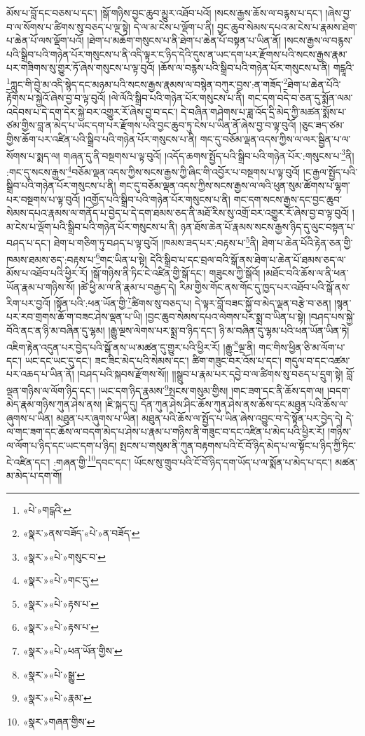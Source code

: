 མོས་པ་བློ་དང་བཅས་པ་དང་། །སྒོ་གཉིས་བྱང་ཆུབ་མྱུར་འཐོབ་པའོ། །སངས་རྒྱས་ཆོས་ལ་བརྙས་པ་དང་། །ཞེས་བྱ་བ་ལ་སོགས་པ་ཚིགས་སུ་བཅད་པ་ལྔ་སྟེ། དེ་ལ་མ་ངེས་པ་ལྡོག་པ་ནི། བྱང་ཆུབ་སེམས་དཔའ་མ་ངེས་པ་རྣམས་ཐེག་པ་ཆེན་པོ་ལས་ལྡོག་པའོ། །ཐེག་པ་མཆོག་གསུངས་པ་ནི་ཐེག་པ་ཆེན་པོ་བསྟན་པ་ཡིན་ནོ། །སངས་རྒྱས་ལ་བརྙས་པའི་སྒྲིབ་པའི་གཉེན་པོར་གསུངས་པ་ནི་འདི་ལྟར་ང་ཉིད་དེའི་དུས་ན་ཡང་དག་པར་རྫོགས་པའི་སངས་རྒྱས་རྣམ་པར་གཟིགས་སུ་གྱུར་ཏོ་ཞེས་གསུངས་པ་ལྟ་བུའོ། །ཆོས་ལ་བརྙས་པའི་སྒྲིབ་པའི་གཉེན་པོར་གསུངས་པ་ནི། གངྒཱའི་\footnote{«པེ་»གངྒའི་}ཀླུང་གི་བྱེ་མ་འདི་སྙེད་དང་མཉམ་པའི་སངས་རྒྱས་རྣམས་ལ་བསྙེན་བཀུར་བྱས་:ན་གཟོད་\footnote{«སྣར་»ནས་བཟོད་«པེ་»ན་བཟོད་}ཐེག་པ་ཆེན་པོའི་རྟོགས་པ་སྐྱེའོ་ཞེས་བྱ་བ་ལྟ་བུའོ། །ལེ་ལོའི་སྒྲིབ་པའི་གཉེན་པོར་གསུངས་པ་ནི། གང་དག་བདེ་བ་ཅན་དུ་སྨོན་ལམ་འདེབས་པ་དེ་དག་དེར་སྐྱེ་བར་འགྱུར་རོ་ཞེས་བྱ་བ་དང་། དེ་བཞིན་གཤེགས་པ་ཟླ་འོད་དྲི་མེད་ཀྱི་མཚན་སྨོས་པ་ཙམ་གྱིས་བླ་ན་མེད་པ་ཡང་དག་པར་རྫོགས་པའི་བྱང་ཆུབ་ཏུ་ངེས་པ་ཡིན་ནོ་ཞེས་བྱ་བ་ལྟ་བུའོ། །ཅུང་ཟད་ཙམ་གྱིས་ཆོག་པར་འཛིན་པའི་སྒྲིབ་པའི་གཉེན་པོར་གསུངས་པ་ནི། གང་དུ་བཅོམ་ལྡན་འདས་ཀྱིས་ལ་ལར་སྦྱིན་པ་ལ་སོགས་པ་སྨད་ལ། གཞན་དུ་ནི་བསྔགས་པ་ལྟ་བུའོ། །འདོད་ཆགས་སྤྱོད་པའི་སྒྲིབ་པའི་གཉེན་པོར་:གསུངས་པ་\footnote{«སྣར་»«པེ་»གསུང་བ་}ནི། :གང་དུ་སངས་རྒྱས་\footnote{«སྣར་»«པེ་»གང་དུ་}བཅོམ་ལྡན་འདས་ཀྱིས་སངས་རྒྱས་ཀྱི་ཞིང་གི་འབྱོར་པ་བསྔགས་པ་ལྟ་བུའོ། །ང་རྒྱལ་སྤྱོད་པའི་སྒྲིབ་པའི་གཉེན་པོར་གསུངས་པ་ནི། གང་དུ་བཅོམ་ལྡན་འདས་ཀྱིས་སངས་རྒྱས་ལ་ལའི་ཕུན་སུམ་ཚོགས་པ་ལྷག་པར་བསྔགས་པ་ལྟ་བུའོ། །འགྱོད་པའི་སྒྲིབ་པའི་གཉེན་པོར་གསུངས་པ་ནི། གང་དག་སངས་རྒྱས་དང་བྱང་ཆུབ་སེམས་དཔའ་རྣམས་ལ་གནོད་པ་བྱེད་པ་དེ་དག་ཐམས་ཅད་ནི་མཐོ་རིས་སུ་འགྲོ་བར་འགྱུར་རོ་ཞེས་བྱ་བ་ལྟ་བུའོ། །མ་ངེས་པ་ལྡོག་པའི་སྒྲིབ་པའི་གཉེན་པོར་གསུངས་པ་ནི། ཉན་ཐོས་ཆེན་པོ་རྣམས་སངས་རྒྱས་ཉིད་དུ་ལུང་བསྟན་པ་བཤད་པ་དང་། ཐེག་པ་གཅིག་ཏུ་བཤད་པ་ལྟ་བུའོ། །ཁམས་ཟད་པར་:བརྟས་པ་\footnote{«སྣར་»«པེ་»རྟས་པ་}ནི། ཐེག་པ་ཆེན་པོའི་རྟེན་ཅན་གྱི་ཁམས་ཐམས་ཅད་:བརྟས་པ་\footnote{«སྣར་»«པེ་»རྟས་པ་}གང་ཡིན་པ་སྟེ། དེའི་སྒྲིབ་པ་དང་བྲལ་བའི་སྒོ་ནས་ཐེག་པ་ཆེན་པོ་ཐམས་ཅད་ལ་མོས་པ་འཐོབ་པའི་ཕྱིར་རོ། །སྒོ་གཉིས་ནི་ཏིང་ངེ་འཛིན་གྱི་སྒོ་དང་། གཟུངས་ཀྱི་སྒོའོ། །མཐོང་བའི་ཆོས་ལ་ནི་ཕན་ཡོན་རྣམ་པ་གཉིས་སོ། །ཚེ་ཕྱི་མ་ལ་ནི་རྣམ་པ་བརྒྱད་དེ། རིམ་གྱིས་གོང་ནས་གོང་དུ་ཁྱད་པར་འཐོབ་པའི་སྒོ་ནས་རིག་པར་བྱའོ། །སྟོན་པའི་:ཕན་ཡོན་གྱི་\footnote{«སྣར་»«པེ་»ཕན་ཡོན་གྱིས་}ཚིགས་སུ་བཅད་པ། དེ་ལྟར་བློ་བཟང་སྐྱོ་བ་མེད་ལྡན་བརྩེ་བ་ཅན། །སྙན་པར་རབ་གྲགས་ཆོ་ག་བཟང་ཤེས་ལྡན་པ་ཡི། །བྱང་ཆུབ་སེམས་དཔའ་ལེགས་པར་སྨྲ་བ་ཡིན་པ་སྟེ། །བཤད་པས་སྐྱེ་བོའི་ནང་ན་ཉི་མ་བཞིན་དུ་ལྷམ། །རྒྱུ་ལྔས་ལེགས་པར་སྨྲ་བ་ཉིད་དང་། ཉི་མ་བཞིན་དུ་ལྷམ་པའི་ཕན་ཡོན་ཡིན་ཏེ། འཇིག་རྟེན་འདུན་པར་བྱེད་པའི་སྒོ་ནས་ཡ་མཚན་དུ་གྱུར་པའི་ཕྱིར་རོ། །རྒྱུ་\footnote{«སྣར་»«པེ་»སྒྱུ་}ལྔ་ནི། གང་གིས་ཕྱིན་ཅི་མ་ལོག་པ་དང་། ཡང་དང་ཡང་དུ་དང་། ཟང་ཟིང་མེད་པའི་སེམས་དང་། ཚིག་གཟུང་བར་འོས་པ་དང་། གདུལ་བ་དང་འཚམ་པར་འཆད་པ་ཡིན་ནོ། །བཤད་པའི་སྐབས་རྫོགས་སོ།། །།སྒྲུབ་པ་རྣམ་པར་དབྱེ་བ་ལ་ཚིགས་སུ་བཅད་པ་དྲུག་སྟེ། བློ་ལྡན་གཉིས་ལ་ལོག་ཉིད་དང་། །ཡང་དག་ཉིད་རྣམས་\footnote{«སྣར་»«པེ་»རྣམ་}སྤངས་གསུམ་གྱིས། །གང་ཟག་དང་ནི་ཆོས་དག་ལ། །བདག་མེད་རྣམ་གཉིས་ཀུན་ཤེས་ནས། །ཇི་སྐད་དུ། དོན་ཀུན་ཤེས་ཤིང་ཆོས་ཀུན་ཤེས་ནས་ཆོས་དང་མཐུན་པའི་ཆོས་ལ་ཞུགས་པ་ཡིན། མཐུན་པར་ཞུགས་པ་ཡིན། མཐུན་པའི་ཆོས་ལ་སྤྱོད་པ་ཡིན་ཞེས་འབྱུང་བ་དེ་སྟོན་པར་བྱེད་དེ། དེ་ལ་གང་ཟག་དང་ཆོས་ལ་བདག་མེད་པ་ཤེས་པ་རྣམ་པ་གཉིས་ནི་གཟུང་བ་དང་འཛིན་པ་མེད་པའི་ཕྱིར་རོ། །གཉིས་ལ་ལོག་པ་ཉིད་དང་ཡང་དག་པ་ཉིད། སྤངས་པ་གསུམ་ནི་ཀུན་བརྟགས་པའི་ངོ་བོ་ཉིད་མེད་པ་ལ་སྟོང་པ་ཉིད་ཀྱི་ཏིང་ངེ་འཛིན་དང་། :གཞན་གྱི་\footnote{«སྣར་»གཞན་གྱིས་}དབང་དང་། ཡོངས་སུ་གྲུབ་པའི་ངོ་བོ་ཉིད་དག་ཡོད་པ་ལ་སྨོན་པ་མེད་པ་དང་། མཚན་མ་མེད་པ་དག་གོ། 